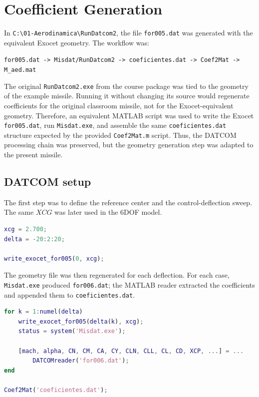 \section{Coefficient Generation}

In \texttt{C:\textbackslash 01-Aerodinamica\textbackslash RunDatcom2}, the file \texttt{for005.dat} was generated with the equivalent Exocet geometry. The workflow was:
\begin{center}
\small
\texttt{for005.dat -> Misdat/RunDatcom2 -> coeficientes.dat -> Coef2Mat -> M\_aed.mat}
\end{center}

The original \texttt{RunDatcom2.exe} from the course package was tied to the geometry of the example missile. Running it without changing its source would regenerate coefficients for the original classroom missile, not for the Exocet-equivalent geometry. Therefore, an equivalent MATLAB script was used to write the Exocet \texttt{for005.dat}, run \texttt{Misdat.exe}, and assemble the same \texttt{coeficientes.dat} structure expected by the provided \texttt{Coef2Mat.m} script. Thus, the DATCOM processing chain was preserved, but the geometry generation step was adapted to the present missile.

\subsection*{DATCOM setup}

The first step was to define the reference center and the control-deflection sweep. The same \(XCG\) was later used in the 6DOF model.

\begin{lstlisting}[language=Matlab]
xcg = 2.700;
delta = -20:2:20;

write_exocet_for005(0, xcg);
\end{lstlisting}

The geometry file was then regenerated for each deflection. For each case, \texttt{Misdat.exe} produced \texttt{for006.dat}; the MATLAB reader extracted the coefficients and appended them to \texttt{coeficientes.dat}.

\begin{lstlisting}[language=Matlab]
for k = 1:numel(delta)
    write_exocet_for005(delta(k), xcg);
    status = system('Misdat.exe');

    [mach, alpha, CN, CM, CA, CY, CLN, CLL, CL, CD, XCP, ...] = ...
        DATCOMreader('for006.dat');
end

Coef2Mat('coeficientes.dat');
\end{lstlisting}

